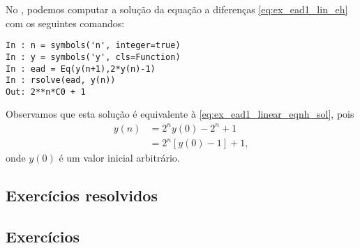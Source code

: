 \begin{ex}
  \ifispython
  No \python, podemos computar a solução da equação a diferenças \eqref{eq:ex_ead1_lin_eh} com os seguintes comandos:
\begin{verbatim}
In : n = symbols('n', integer=true)
In : y = symbols('y', cls=Function)
In : ead = Eq(y(n+1),2*y(n)-1)
In : rsolve(ead, y(n))
Out: 2**n*C0 + 1
\end{verbatim}
  Observamos que esta solução é equivalente à \eqref{eq:ex_ead1_linear_eqnh_sol}, pois
  \begin{align}
    y(n) &= 2^ny(0) - 2^{n} + 1 \\
         &= 2^n\left[y(0)-1\right]+1,
  \end{align}
  onde $y(0)$ é um valor inicial arbitrário.
  \fi
\end{ex}

\subsection*{Exercícios resolvidos}

\emconstrucao

\subsection*{Exercícios}

\emconstrucao